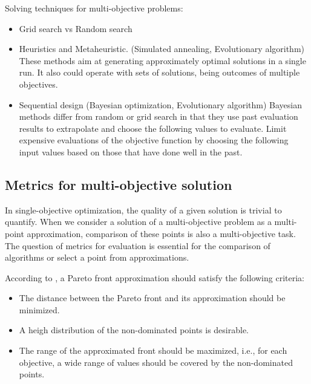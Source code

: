 

        Solving techniques for multi-objective problems: 
        \begin{itemize}
            \item Grid search vs Random search
            \item Heuristics and Metaheuristic. (Simulated annealing, Evolutionary algorithm) These methods aim at generating approximately optimal solutions in a single run. It also could operate with sets of solutions, being outcomes of multiple objectives.
            \item Sequential design (Bayesian optimization, Evolutionary algorithm) Bayesian methods differ from random or grid search in that they use past evaluation results to extrapolate and choose the following values to evaluate. Limit expensive evaluations of the objective function by choosing the following input values based on those that have done well in the past.
        \end{itemize}

        \subsection{Metrics for multi-objective solution}
            In single-objective optimization, the quality of a given solution is trivial to quantify. When we consider a solution of a multi-objective problem as a multi-point approximation, comparison of these points is also a multi-objective task.
            The question of metrics for evaluation is essential for the comparison of algorithms or select a point from approximations.

            According to \cite{ZitzlerDT00}, a Pareto front approximation should satisfy the following criteria:
            \begin{itemize}
                \item The distance between the Pareto front and its approximation should be minimized.
                \item A heigh distribution of the non-dominated points is desirable.
                \item The range of the approximated front should be maximized, i.e., for each objective, a wide range of values should be covered by the non-dominated points.
            \end{itemize}

